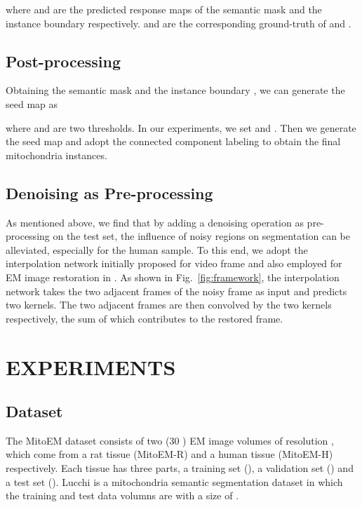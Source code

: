\documentclass{article}
\begin{document}
where  and  are the predicted response maps of the semantic mask and the instance boundary respectively.  and  are the corresponding ground-truth of  and .


\subsection{Post-processing}
Obtaining the semantic mask  and the instance boundary , we can generate the seed map  as 

where  and  are two thresholds. In our experiments, we set  and . Then we generate the seed map and adopt the connected component labeling   to obtain the final mitochondria instances.

\subsection{Denoising as Pre-processing}
As mentioned above, we find that by adding a denoising operation as pre-processing on the test set, the influence of noisy regions on segmentation can be alleviated, especially for the human sample.  To this end, we adopt the interpolation network initially proposed for video frame \cite{niklaus2017video} and also employed for EM image restoration in \cite{huang2020learning}. As shown in Fig.~\ref{fig:framework}, the interpolation network takes the two adjacent frames of the noisy frame as input and predicts two kernels. The two adjacent frames are then convolved by the two kernels respectively, the sum of which contributes to the restored frame. 








\section{EXPERIMENTS}
\label{sec:exp}
\subsection{Dataset}
The MitoEM dataset \cite{wei2020mitoem} consists of two (30 ) EM image volumes of resolution  , which come from a rat tissue (MitoEM-R) and a human tissue (MitoEM-H) respectively. 
Each tissue has three parts, a training set (), a validation set () and a test set (). 
Lucchi \cite{lucchi2011supervoxel} is a mitochondria semantic segmentation dataset in which the training and test data volumns are with a size of .
\vspace{-0.7em}
\end{document}
